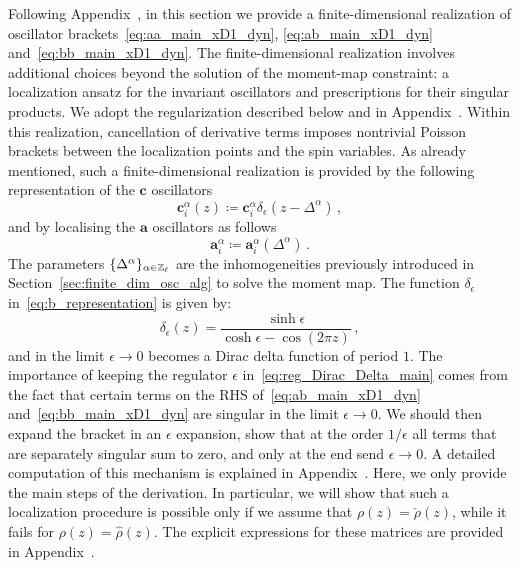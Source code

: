 Following Appendix~, in this section we provide a finite-dimensional realization of oscillator brackets~\eqref{eq:aa_main_xD1_dyn}, \eqref{eq:ab_main_xD1_dyn} and~\eqref{eq:bb_main_xD1_dyn}.
The finite-dimensional realization involves additional choices beyond
the solution of the moment-map constraint: a localization ansatz for
the invariant oscillators and prescriptions for their singular
products. We adopt the regularization described below and in
Appendix~. Within this realization, cancellation
of derivative terms imposes nontrivial Poisson brackets between the
localization points and the spin variables.
As already mentioned, such a finite-dimensional realization is provided by the following representation of the $\mathbf{c}$ oscillators
\begin{equation}
\label{eq:b_representation}
\mathbf{c}_i^\alpha(z) \coloneq \mathbf{c}_i^\alpha \delta_\epsilon(z-\Delta^\alpha) \,,
\end{equation}
and by localising the $\mathbf{a}$ oscillators as follows
\begin{equation}
\mathbf{a}_i^\alpha \coloneq \mathbf{a}_i^\alpha(\Delta^\alpha) \,.
\end{equation}
The parameters $\{\Delta^\alpha\}_{\alpha \in \mathbb{Z}_\ell}$ are the inhomogeneities previously introduced in Section~\ref{sec:finite_dim_osc_alg} to solve the moment map. The function $\delta_\epsilon$ in~\eqref{eq:b_representation} is given by:
\begin{equation}
\label{eq:reg_Dirac_Delta_main}
\delta_\epsilon(z)= \frac{\sinh \epsilon}{\cosh \epsilon - \cos(2\pi z)} \,,
\end{equation}
and in the limit $\epsilon \to 0$ becomes a Dirac delta function of period $1$. The importance of keeping the regulator $\epsilon$ in~\eqref{eq:reg_Dirac_Delta_main} comes from the fact that certain terms on the RHS of~\eqref{eq:ab_main_xD1_dyn} and~\eqref{eq:bb_main_xD1_dyn} are singular in the limit $\epsilon \to 0$. 
We should then expand the bracket in an $\epsilon$ expansion, show that at the order $1/\epsilon$ all terms that are separately singular sum to zero, and only at the end send $\epsilon \to 0$. A detailed computation of this mechanism is explained in Appendix~. 
Here, we only provide the main steps of the derivation. In particular, we will show that such a localization procedure is possible only if we assume that $\rho(z)= \check{\rho}(z)$, while it fails for $\rho(z)= \hat{\rho}(z)$.
The explicit expressions for these matrices are provided in Appendix~\todo{[TODO: missing appendix \texttt{app:rho\_matrices} of the paper; rewrite with period 1; include the overall factor $\varkappa=2\pi\I$]}.


